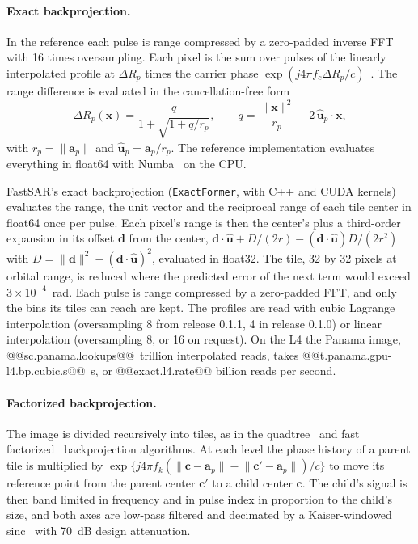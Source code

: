 \documentclass[11pt]{article}
\begin{document}
\paragraph{Exact backprojection.} In the reference each pulse is range compressed by a zero-padded inverse FFT with 16 times oversampling. Each pixel is the sum over pulses of the linearly interpolated profile at $\Delta R_p$ times the carrier phase $\exp(j 4\pi f_c \Delta R_p / c)$~\cite{gorham2010}. The range difference is evaluated in the cancellation-free form
\begin{equation}
\Delta R_p(\mathbf{x}) = \frac{q}{1 + \sqrt{1 + q / r_p}}, \qquad q = \frac{\lVert\mathbf{x}\rVert^2}{r_p} - 2\, \hat{\mathbf{u}}_p \cdot \mathbf{x},
\end{equation}
with $r_p = \lVert\mathbf{a}_p\rVert$ and $\hat{\mathbf{u}}_p = \mathbf{a}_p / r_p$. The reference implementation evaluates everything in float64 with Numba~\cite{lam2015} on the CPU.

FastSAR's exact backprojection (\texttt{ExactFormer}, with C++ and CUDA kernels) evaluates the range, the unit vector and the reciprocal range of each tile center in float64 once per pulse. Each pixel's range is then the center's plus a third-order expansion in its offset $\mathbf{d}$ from the center, $\mathbf{d}\cdot\hat{\mathbf{u}} + D/(2r) - (\mathbf{d}\cdot\hat{\mathbf{u}})D/(2r^2)$ with $D = \lVert\mathbf{d}\rVert^2 - (\mathbf{d}\cdot\hat{\mathbf{u}})^2$, evaluated in float32. The tile, 32 by 32 pixels at orbital range, is reduced where the predicted error of the next term would exceed $3\times10^{-4}$~rad. Each pulse is range compressed by a zero-padded FFT, and only the bins its tiles can reach are kept. The profiles are read with cubic Lagrange interpolation (oversampling 8 from release 0.1.1, 4 in release 0.1.0) or linear interpolation (oversampling 8, or 16 on request). On the L4 the Panama image, @@sc.panama.lookups@@~trillion interpolated reads, takes @@t.panama.gpu-l4.bp.cubic.s@@~s, or @@exact.l4.rate@@ billion reads per second.

\paragraph{Factorized backprojection.} The image is divided recursively into tiles, as in the quadtree~\cite{mccorkle1996,xiao2000} and fast factorized~\cite{ulander2003} backprojection algorithms. At each level the phase history of a parent tile is multiplied by $\exp\{j 4\pi f_k (\lVert \mathbf{c} - \mathbf{a}_p \rVert - \lVert \mathbf{c}' - \mathbf{a}_p \rVert)/c\}$ to move its reference point from the parent center $\mathbf{c}'$ to a child center $\mathbf{c}$. The child's signal is then band limited in frequency and in pulse index in proportion to the child's size, and both axes are low-pass filtered and decimated by a Kaiser-windowed sinc~\cite{kaiser1974} with 70~dB design attenuation.
\end{document}
